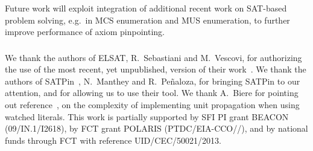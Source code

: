\documentclass{llncs}
\newcommand{\elsat}{ELSAT\xspace}
\begin{document}
Future work will exploit integration of additional recent work on
SAT-based problem solving, e.g.\ in MCS enumeration and MUS
enumeration, to further improve performance of axiom pinpointing. 


\subsubsection*{\ackname}
We thank the authors of \elsat, R.\ Sebastiani and M.\ Vescovi, for
authorizing the use of the most recent, yet unpublished, version of
their work~\cite{sebastiani-tr15}.
We thank the authors of SATPin~\cite{mp-tr15}, N.\ Manthey and
R.\ Pe\~{n}aloza, for bringing SATPin to our attention, and for
allowing us to use their tool.
We thank A.\ Biere for pointing out reference~\cite{gent-jair13}, on
the complexity of implementing unit propagation when using watched
literals.
This work is partially supported by SFI PI grant BEACON (09/IN.1/\-I2618),
by FCT grant POLARIS (PTDC/EIA-CCO//), and by national funds
through FCT with reference UID/CEC/50021/2013.

\clearpage
\end{document}
